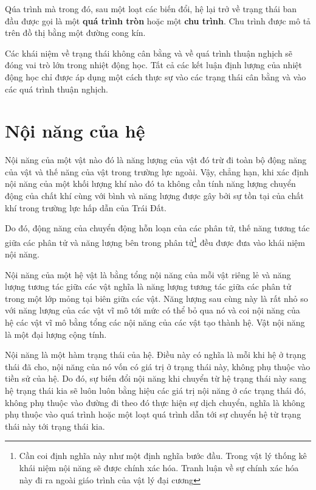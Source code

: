 Qúa trình mà trong đó, sau một loạt các biến đổi, hệ lại trở về trạng thái ban đầu được gọi là một \textbf{quá trình tròn} hoặc một \textbf{chu trình}. Chu trình được mô tả trên đồ thị bằng một đường cong kín.

Các khái niệm về trạng thái không cân bằng và về quá trình thuận nghịch sẽ đóng vai trò lớn trong nhiệt động học. Tất cả các kết luận định lượng của nhiệt động học chỉ được áp dụng một cách thực sự vào các trạng thái cân bằng và vào các quá trình thuận nghịch.

\section{Nội năng của hệ}\label{sec:10_4}

Nội năng của một vật nào đó là năng lượng của vật đó trừ đi toàn bộ động năng của vật và thế năng của vật trong trường lực ngoài. Vậy, chẳng hạn, khi xác định nội năng của một khối lượng khí nào đó ta không cần tính năng lượng chuyển động của chất khí cùng với bình và năng lượng được gây bởi sự tồn tại của chất khí trong trường lực hấp dẫn của Trái Đất.

Do đó, động năng của chuyển động hỗn loạn của các phân tử, thế năng tương tác giữa các phân tử và năng lượng bên trong phân tử\footnote{Cần coi định nghĩa này như một định nghĩa bước đầu. Trong vật lý thống kê khái niệm nội năng sẽ được chính xác hóa. Tranh luận về sự chính xác hóa này đi ra ngoài giáo trình của vật lý đại cương} đều được đưa vào khái niệm nội năng.

Nội năng của một hệ vật là bằng tổng nội năng của mỗi vật riêng lẻ và năng lượng tương tác giữa các vật nghĩa là năng lượng tương tác giữa các phân tử trong một lớp mỏng tại biên giữa các vật. Năng lượng sau cùng này là rất nhỏ so với năng lượng của các vật vĩ mô tới mức có thể bỏ qua nó và coi nội năng của hệ các vật vĩ mô bằng tổng các nội năng của các vật tạo thành hệ. Vật nội năng là một đại lượng cộng tính.

Nội năng là một hàm trạng thái của hệ. Điều này có nghĩa là mỗi khi hệ ở trạng thái đã cho, nội năng của nó vốn có giá trị ở trạng thái này, không phụ thuộc vào tiền sử của hệ. Do đó, sự biến đổi nội năng khi chuyển từ hệ trạng thái này sang hệ trạng thái kia sẽ luôn luôn bằng hiệu các giá trị nội năng ở các trạng thái đó, không phụ thuộc vào đường đi theo đó thực hiện sự dịch chuyển, nghĩa là không phụ thuộc vào quá trình hoặc một loạt quá trình dẫn tới sự chuyển hệ từ trạng thái này tới trạng thái kia.

